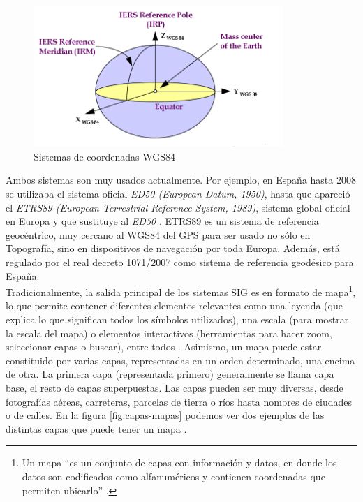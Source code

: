 \begin{figure}[H]
	\centering
	\includegraphics[height=5.35cm]{imagenes/capitulo2/Figure-36-World-Geodetic-System-1984-WGS84}
	\caption{Sistemas de coordenadas WGS84 \cite{WGS84}}
	\label{fig:WGS84}
\end{figure}

Ambos sistemas son muy usados actualmente. Por ejemplo, en España hasta 2008 se utilizaba el sistema oficial \textit{ED50 (European Datum, 1950)}, hasta que apareció el \textit{ETRS89 (European Terrestrial Reference System, 1989)}, sistema global oficial en Europa y que sustituye al \textit{ED50} \cite{AsignaturaSIG}. ETRS89 es un sistema de referencia geocéntrico,  muy cercano al WGS84 del GPS para ser usado no sólo en Topografía, sino en dispositivos de navegación por toda Europa. Además, está regulado por el real decreto 1071/2007 como sistema de referencia geodésico para España.\\

Tradicionalmente, la salida principal de los sistemas SIG es en formato de mapa\footnote{Un mapa ``es un conjunto de capas con información y datos, en donde los datos son codificados como alfanuméricos y contienen coordenadas que permiten ubicarlo'' \cite{congreso-ritsi}.}, lo que permite contener diferentes elementos relevantes como una leyenda (que explica lo que significan todos los símbolos utilizados), una escala (para mostrar la escala del mapa) o elementos interactivos (herramientas para hacer zoom, seleccionar capas o buscar), entre todos \cite{tesis}. Asimismo, un mapa puede estar constituido por varias capas, representadas en un orden determinado, una encima de otra. La primera capa (representada primero) generalmente se llama capa base, el resto de capas superpuestas. Las capas pueden ser muy diversas, desde fotografías aéreas, carreteras, parcelas de tierra o ríos hasta nombres de ciudades o de calles. En la figura \ref{fig:capas-mapas} podemos ver dos ejemplos de las distintas capas que puede tener un mapa \cite{VictorOlaya}.

